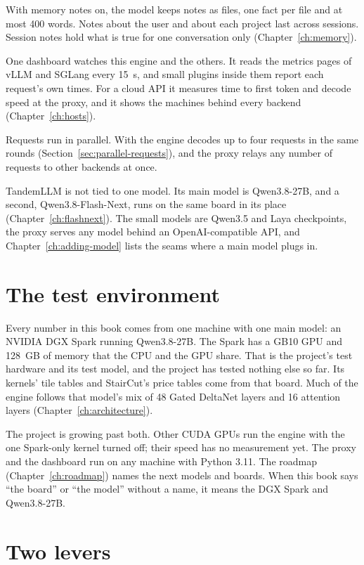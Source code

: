 With memory notes on, the model keeps notes as files, one fact per file and at most 400 words. Notes about the user and about each project last across sessions. Session notes hold what is true for one conversation only (Chapter~\ref{ch:memory}).

One dashboard watches this engine and the others. It reads the metrics pages of vLLM and SGLang every 15~s, and small plugins inside them report each request's own times. For a cloud API it measures time to first token and decode speed at the proxy, and it shows the machines behind every backend (Chapter~\ref{ch:hosts}).

Requests run in parallel. With  the engine decodes up to four requests in the same rounds (Section~\ref{sec:parallel-requests}), and the proxy relays any number of requests to other backends at once.

TandemLLM is not tied to one model. Its main model is Qwen3.8-27B, and a second, Qwen3.8-Flash-Next, runs on the same board in its place (Chapter~\ref{ch:flashnext}). The small models are Qwen3.5 and Laya checkpoints, the proxy serves any model behind an OpenAI-compatible API, and Chapter~\ref{ch:adding-model} lists the seams where a main model plugs in.

\section{The test environment}\label{sec:test-env}

Every number in this book comes from one machine with one main model: an NVIDIA DGX Spark running Qwen3.8-27B. The Spark has a GB10 GPU and 128~GB of memory that the CPU and the GPU share. That is the project's test hardware and its test model, and the project has tested nothing else so far. Its kernels' tile tables and StairCut's price tables come from that board. Much of the engine follows that model's mix of 48 Gated DeltaNet layers and 16 attention layers (Chapter~\ref{ch:architecture}).

The project is growing past both. Other CUDA GPUs run the engine with the one Spark-only kernel turned off; their speed has no measurement yet. The proxy and the dashboard run on any machine with Python 3.11. The roadmap (Chapter~\ref{ch:roadmap}) names the next models and boards. When this book says \enquote{the board} or \enquote{the model} without a name, it means the DGX Spark and Qwen3.8-27B.

\section{Two levers}

